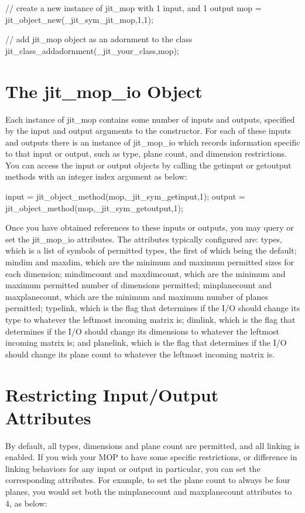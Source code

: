\begin{DoxyCode}
   // create a new instance of jit_mop with 1 input, and 1 output 
   mop = jit_object_new(_jit_sym_jit_mop,1,1);
   
   // add jit_mop object as an adornment to the class
   jit_class_addadornment(_jit_your_class,mop);
\end{DoxyCode}
\hypertarget{chapter_jit_mopdetails_chapter_jit_mopdetails_io}{}\section{The jit\_\-mop\_\-io Object}\label{chapter_jit_mopdetails_chapter_jit_mopdetails_io}
Each instance of jit\_\-mop contains some number of inputs and outputs, specified by the input and output arguments to the constructor. For each of these inputs and outputs there is an instance of jit\_\-mop\_\-io which records information specific to that input or output, such as type, plane count, and dimension restrictions. You can access the input or output objects by calling the getinput or getoutput methods with an integer index argument as below:


\begin{DoxyCode}
   input = jit_object_method(mop,_jit_sym_getinput,1);
   output = jit_object_method(mop,_jit_sym_getoutput,1);
\end{DoxyCode}


Once you have obtained references to these inputs or outputs, you may query or set the jit\_\-mop\_\-io attributes. The attributes typically configured are: types, which is a list of symbols of permitted types, the first of which being the default; mindim and maxdim, which are the minimum and maximum permitted sizes for each dimension; mindimcount and maxdimcount, which are the minimum and maximum permitted number of dimensions permitted; minplanecount and maxplanecount, which are the minimum and maximum number of planes permitted; typelink, which is the flag that determines if the I/O should change its type to whatever the leftmost incoming matrix is; dimlink, which is the flag that determines if the I/O should change its dimensions to whatever the leftmost incoming matrix is; and planelink, which is the flag that determines if the I/O should change its plane count to whatever the leftmost incoming matrix is.\hypertarget{chapter_jit_mopdetails_chapter_jit_mopdetails_restrictingattrs}{}\section{Restricting Input/Output Attributes}\label{chapter_jit_mopdetails_chapter_jit_mopdetails_restrictingattrs}
By default, all types, dimensions and plane count are permitted, and all linking is enabled. If you wish your MOP to have some specific restrictions, or difference in linking behaviors for any input or output in particular, you can set the corresponding attributes. For example, to set the plane count to always be four planes, you would set both the minplanecount and maxplanecount attributes to 4, as below:


